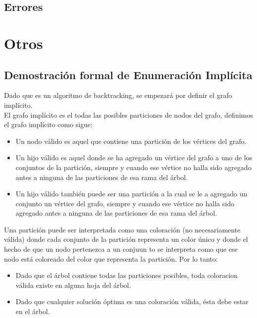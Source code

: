\documentclass[a4paper,10pt]{article}
\begin{document}
\subsection{Errores}


\section{Otros}
\subsection{Demostración formal de Enumeración Implícita}
Dado que es un algoritmo de backtracking, se empezar\'a por definir el
grafo impl\'icito.\\
\indent El grafo impl\'icito es el todas las posibles particiones de
nodos del grafo, definimos el grafo impl\'icito como sigue:
\begin{itemize}
 \item Un nodo v\'alido es aquel que contiene una partici\'on de los
       v\'ertices del grafo.
 \item Un hijo v\'alido es aquel donde se ha agregado un v\'ertice del
       grafo a uno de los conjuntos de la partici\'on, siempre y cuando
       ese v\'ertice no halla sido agregado antes a ninguna de las
       particiones de esa rama del \'arbol.
 \item Un hijo v\'alido tambi\'en puede ser una partici\'on a la cual se
       le a agregado un conjunto un v\'ertice del grafo, siempre y
       cuando ese v\'ertice no halla sido agregado antes a ninguna de
       las particiones de esa rama del \'arbol.
\end{itemize}
\indent Una partici\'on puede ser interpretada como una coloraci\'on (no
necesariamente v\'alida) donde cada conjunto de la partici\'on
representa un color \'unico y donde el hecho de que un nodo pertenezca a
un conjuun to se interpreta como que ese nodo est\'a coloreado del color
que representa la partici\'on.
Por lo tanto:
\begin{itemize}
 \item Dado que el \'arbol contiene todas las particiones posibles,
 toda coloracion v\'alida existe en alguna hoja del \'arbol.
 \item Dado que cualquier soluci\'on \'optima es una coloraci\'on
 v\'alida, \'esta debe estar en el \'arbol.
\end{itemize}
\end{document}

